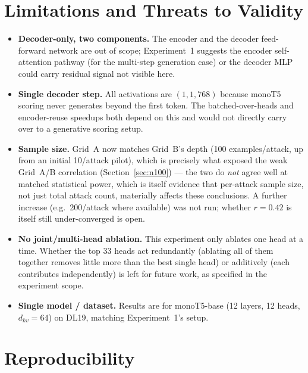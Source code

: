\documentclass[11pt]{article}
\begin{document}
\section{Limitations and Threats to Validity}

\begin{itemize}
  \item \textbf{Decoder-only, two components.} The encoder and the decoder
  feed-forward network are out of scope; Experiment~1 suggests the encoder
  self-attention pathway (for the multi-step generation case) or the
  decoder MLP could carry residual signal not visible here.
  \item \textbf{Single decoder step.} All activations are $(1,1,768)$
  because monoT5 scoring never generates beyond the first token. The
  batched-over-heads and encoder-reuse speedups both depend on this and
  would not directly carry over to a generative scoring setup.
  \item \textbf{Sample size.} Grid~A now matches Grid~B's depth (100
  examples/attack, up from an initial 10/attack pilot), which is precisely
  what exposed the weak Grid~A/B correlation (Section~\ref{sec:n100}) — the
  two do \emph{not} agree well at matched statistical power, which is
  itself evidence that per-attack sample size, not just total attack count,
  materially affects these conclusions. A further increase (e.g.\ 200/attack
  where available) was not run; whether $r=0.42$ is itself still
  under-converged is open.
  \item \textbf{No joint/multi-head ablation.} This experiment only ablates
  one head at a time. Whether the top 33 heads act redundantly (ablating
  all of them together removes little more than the best single head) or
  additively (each contributes independently) is left for future work, as
  specified in the experiment scope.
  \item \textbf{Single model / dataset.} Results are for monoT5-base
  (12 layers, 12 heads, $d_{kv}=64$) on DL19, matching Experiment~1's setup.
\end{itemize}

\section{Reproducibility}
\end{document}
